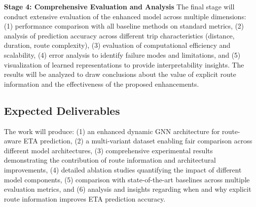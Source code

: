 \textbf{Stage 4: Comprehensive Evaluation and Analysis}
The final stage will conduct extensive evaluation of the enhanced model across multiple dimensions: (1) performance comparison with all baseline methods on standard metrics, (2) analysis of prediction accuracy across different trip characteristics (distance, duration, route complexity), (3) evaluation of computational efficiency and scalability, (4) error analysis to identify failure modes and limitations, and (5) visualization of learned representations to provide interpretability insights. The results will be analyzed to draw conclusions about the value of explicit route information and the effectiveness of the proposed enhancements.

\subsection{Expected Deliverables}

The work will produce: (1) an enhanced dynamic GNN architecture for route-aware ETA prediction, (2) a multi-variant dataset enabling fair comparison across different model architectures, (3) comprehensive experimental results demonstrating the contribution of route information and architectural improvements, (4) detailed ablation studies quantifying the impact of different model components, (5) comparison with state-of-the-art baselines across multiple evaluation metrics, and (6) analysis and insights regarding when and why explicit route information improves ETA prediction accuracy.

